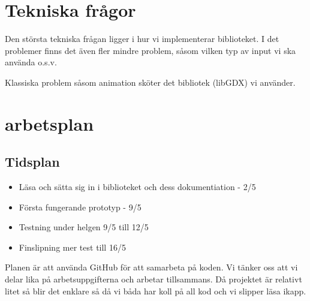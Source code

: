 \documentclass[a4paper,11pt]{article}
\begin{document}
\section{Tekniska frågor}
Den största tekniska frågan ligger i hur vi implementerar biblioteket. I det problemer finns det även fler mindre problem, såsom vilken typ av input vi ska använda o.s.v. 

Klassiska problem såsom animation sköter det bibliotek (libGDX) vi använder.

\section{arbetsplan}
\subsection{Tidsplan}
\begin{itemize}
\item Läsa och sätta sig in i biblioteket och dess dokumentiation - 2/5
\item Första fungerande prototyp - 9/5
\item Testning under helgen 9/5 till 12/5
\item Finslipning mer test till 16/5
\end{itemize}

Planen är att använda GitHub för att samarbeta på koden. Vi tänker oss att vi delar lika på arbetsuppgifterna och arbetar tillsammans. Då projektet är relativt litet så blir det enklare så då vi båda har koll på all kod och vi slipper läsa ikapp.
\pagebreak
\end{document}
